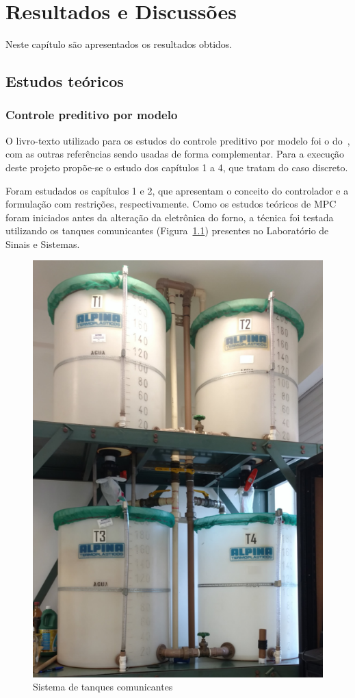 
\chapter{Resultados e Discussões}%
\label{chp:results}

Neste capítulo são apresentados os resultados obtidos.

\section{Estudos teóricos}%
\label{sec:studies}

\subsection{Controle preditivo por modelo}%
\label{subsec:mpc-studies}

O livro-texto utilizado para os estudos do controle preditivo por modelo foi o
do~\textcite{book:wang}, com as outras referências sendo usadas de forma
complementar. Para a execução deste projeto propõe-se o estudo dos capítulos 1 a
4, que tratam do caso discreto.

Foram estudados os capítulos 1 e 2, que apresentam o conceito do controlador e a
formulação com restrições, respectivamente. Como os estudos teóricos de \ac{MPC}
foram iniciados antes da alteração da eletrônica do forno, a técnica foi testada
utilizando os tanques comunicantes (Figura~\ref{fig:tanks}) presentes no
Laboratório de Sinais e Sistemas.

\begin{figure}[ht!]
	\centering
	\captionsetup{justification=centering}
	\includegraphics[height=0.5\linewidth]{imgs/tanques}
	\caption{Sistema de tanques comunicantes}%
	\label{fig:tanks}
\end{figure}

